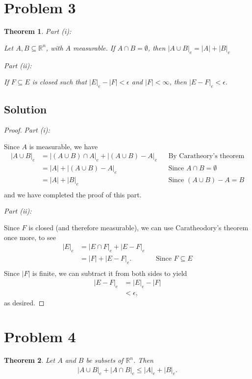 \documentclass[10pt,a4paper]{article}
\makeatletter
\theoremstyle{theorem}
\newtheorem{theorem}{Theorem}
\newcommand{\proofpart}[2]{%
  \par
  \addvspace{\medskipamount}%
  \noindent\emph{Part #1: #2}\par\nobreak
  \addvspace{\smallskipamount}%
  \@afterheading
}
\theoremstyle{definition}
\makeatother
\begin{document}
\section*{Problem 3}
\begin{theorem}
\proofpart{(i)}{} 
Let $A, B \subseteq \mathbb{R}^n$, with $A$ measurable.  If $A \cap B = \emptyset$, then $|A \cup B|_e = |A| + |B|_e$

\proofpart{(ii)}{} 
If $F \subseteq E$ is closed such that $|E|_e - |F| < \epsilon$ and $|F| < \infty$, then $|E - F|_e < \epsilon$.
\end{theorem}

\subsection*{Solution}
\begin{proof}
\proofpart{(i)}{} 
Since $A$ is measurable, we have
\begin{align*}
|A \cup B|_e &= |(A \cup B) \cap A|_e + |(A \cup B) - A|_e &&\text{By Caratheory's theorem}\\
&= |A| + |(A \cup B) - A|_e &&\text{Since } A \cap B = \emptyset\\
&= |A| + |B|_e &&\text{Since } (A \cup B) - A = B\\
\end{align*}
and we have completed the proof of this part.

\proofpart{(ii)}{}
Since $F$ is closed (and therefore measurable), we can use Caratheodory's theorem once more, to see
\begin{align*}
|E|_e &= |E \cap F|_e + |E - F|_e\\
&= |F| + |E - F|_e. &&\text{Since } F \subseteq E\\ 
\end{align*} 
Since $|F|$ is finite, we can subtract it from both sides to yield
\begin{align*}
|E - F|_e &= |E|_e - |F|\\
&< \epsilon,
\end{align*}
as desired.
\end{proof}

\section*{Problem 4}
\begin{theorem}
Let $A$ and $B$ be subsets of $\mathbb{R}^n$. Then 
\begin{align*}
|A \cup B|_e + |A \cap B|_e \leq |A|_e + |B|_e.
\end{align*}
\end{theorem}
\end{document}
